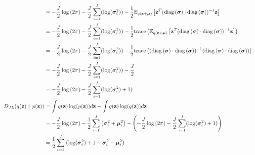 \documentclass[a4paper]{article}
\begin{document}
\begin{align*}
    & = -\frac{J}{2} \log\left( 2\pi \right) -
    \frac{J}{2} \sum\limits_{i=1}^{J}(\log(\bm{\sigma}_i^2)) - 
    \frac{1}{2} {\mathbb{E}_{q(\mathbf{z} + \bm{\mu})}\left[\mathbf{z}^T (\text{diag}\left(\bm{\sigma}\right) \cdot
    \text{diag}\left(\bm{\sigma}\right))^{-1} \mathbf{z}\right]} 
    \\
    & = -\frac{J}{2} \log\left( 2\pi \right) -
    \frac{J}{2} \sum\limits_{i=1}^{J}(\log(\bm{\sigma}_i^2)) - 
    \frac{1}{2} \text{trace}\left({\mathbb{E}_{q(\mathbf{z} + \bm{\mu})}\left[\mathbf{z}^T (\text{diag}\left(\bm{\sigma}\right) \cdot
    \text{diag}\left(\bm{\sigma}\right))^{-1} \mathbf{z}\right]} \right)
    \\
    & = -\frac{J}{2} \log\left( 2\pi \right) - 
    \frac{J}{2} \sum\limits_{i=1}^{J}(\log(\bm{\sigma}_i^2)) - \frac{1}{2}
    \text{trace}\left((\text{diag}\left(\bm{\sigma}\right) \cdot \text{diag}\left(\bm{\sigma}\right))^{-1} (\text{diag}\left(\bm{\sigma}\right) \cdot
    \text{diag}\left(\bm{\sigma}\right))\right)
    \\
    & = -\frac{J}{2} \log\left( 2\pi \right) - 
    \frac{J}{2} \sum\limits_{i=1}^{J}(\log(\bm{\sigma}_i^2)) - \frac{J}{2}
    \\
    & = -\frac{J}{2} \log\left( 2\pi \right) -
    \frac{J}{2} \sum\limits_{i=1}^{J} (\log(\bm{\sigma}_i^2) + 1)
    \\
    D_{JL}(q(\mathbf{z}) \parallel p(\mathbf{z})) & = 
    \int q(\mathbf{z}) \log(p(\mathbf{z})) d\mathbf{z} - \int q(\mathbf{z}) \log(q(\mathbf{z})) d\mathbf{z} 
    \\
    & = -\frac{J}{2} \log\left( 2\pi \right) - \frac{1}{2}
    \sum\limits_{i=1}^{J} \left( \bm{\sigma}_i^2 + \bm{\mu}_i^2 \right)
    - \left(-\frac{J}{2} \log\left( 2\pi \right) -
    \frac{J}{2} \sum\limits_{i=1}^{J} (\log(\bm{\sigma}_i^2) + 1) \right)
    \\
    & = \frac{1}{2} \sum\limits_{i=1}^{J} \left( \log(\bm{\sigma}_i^2) + 1 - \bm{\sigma}_i^2 - \bm{\mu}_i^2\right)
\end{align*}
\end{document}

